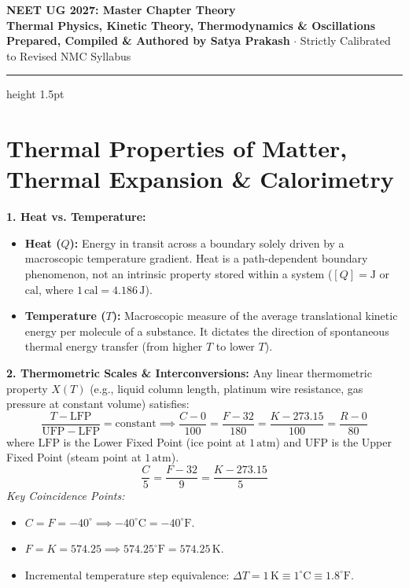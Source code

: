 \documentclass[10pt,a4paper]{article}
\begin{document}
\begin{center}
  {\Huge \textbf{NEET UG 2027: Master Chapter Theory}}\\[6pt]
  {\Large \textbf{Thermal Physics, Kinetic Theory, Thermodynamics \& Oscillations}}\\[4pt]
  {\small \textbf{Prepared, Compiled \& Authored by Satya Prakash} $\cdot$ Strictly Calibrated to Revised NMC Syllabus}
  \vspace{4pt}
  \hrule height 1.5pt
\end{center}

\section{Thermal Properties of Matter, Thermal Expansion \& Calorimetry}

\begin{conceptbox}
\textbf{1. Heat vs. Temperature:}
\begin{itemize}
  \item \textbf{Heat ($Q$):} Energy in transit across a boundary solely driven by a macroscopic temperature gradient. Heat is a path-dependent boundary phenomenon, not an intrinsic property stored within a system ($[Q] = \mathrm{J}$ or $\mathrm{cal}$, where $1\,\mathrm{cal} = 4.186\,\mathrm{J}$).
  \item \textbf{Temperature ($T$):} Macroscopic measure of the average translational kinetic energy per molecule of a substance. It dictates the direction of spontaneous thermal energy transfer (from higher $T$ to lower $T$).
\end{itemize}
\textbf{2. Thermometric Scales \& Interconversions:}
Any linear thermometric property $X(T)$ (e.g., liquid column length, platinum wire resistance, gas pressure at constant volume) satisfies:
\begin{equation}
  \frac{T - \mathrm{LFP}}{\mathrm{UFP} - \mathrm{LFP}} = \text{constant} \implies \frac{C - 0}{100} = \frac{F - 32}{180} = \frac{K - 273.15}{100} = \frac{R - 0}{80}
\end{equation}
where $\mathrm{LFP}$ is the Lower Fixed Point (ice point at $1\,\mathrm{atm}$) and $\mathrm{UFP}$ is the Upper Fixed Point (steam point at $1\,\mathrm{atm}$).
\begin{equation}
  \frac{C}{5} = \frac{F - 32}{9} = \frac{K - 273.15}{5}
\end{equation}
\textit{Key Coincidence Points:}
\begin{itemize}
  \item $C = F = -40^\circ \implies -40^\circ\mathrm{C} = -40^\circ\mathrm{F}$.
  \item $F = K = 574.25 \implies 574.25^\circ\mathrm{F} = 574.25\,\mathrm{K}$.
  \item Incremental temperature step equivalence: $\Delta T = 1\,\mathrm{K} \equiv 1^\circ\mathrm{C} \equiv 1.8^\circ\mathrm{F}$.
\end{itemize}
\end{conceptbox}
\end{document}
